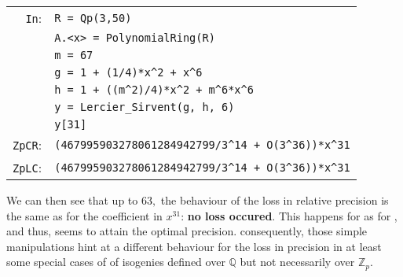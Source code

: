 \documentclass[sigconf]{acmart}
\newcommand{\ZpCR}{\text{\color{output} \rm \tt ZpCR}\xspace}
\newcommand{\ZpLC}{\text{\color{output} \rm \tt ZpLC}\xspace}
\newcommand{\cIn}{{\color{input} \tt \phantom{Zp}In}:}
\newcommand{\cZpCR}{{\color{output} \tt ZpCR}:}
\newcommand{\cZpLC}{{\color{output} \tt ZpLC}:}
\theoremstyle{definition}
\begin{document}
\smallskip

{\noindent \small
\begin{tabular}{rl}
\cIn
 & \verb?R = Qp(3,50)? \\
 & \verb?A.<x> = ?{\color{constructor}\verb?PolynomialRing?}\verb?(R)? \\
 & \verb?m = 67? \\
 & \verb?g = 1 + (1/4)*x^2 + x^6? \\
 & \verb?h = 1 + ((m^2)/4)*x^2 + m^6*x^6? \\
 & \verb?y = ?{\color{function}\verb?Lercier_Sirvent?}\verb?(g, h, 6)? \\
 & \verb?y[31]? \\
\cZpCR
 & \verb?(467995903278061284942799/3^14 + O(3^36))*x^31? \\
\cZpLC
 & \verb?(467995903278061284942799/3^14 + O(3^36))*x^31? \\
\end{tabular}}

\smallskip

We can then see that up to $63,$ the behaviour
of the loss in relative precision is the same
as for the coefficient in $x^{31}$: \textbf{no loss
occured}. This happens for \ZpCR as for \ZpLC,
and thus, \ZpCR seems to attain the optimal precision.
consequently, those simple manipulations
hint at a different behaviour for the loss 
in precision in at least some special cases of
of isogenies defined over $\mathbb{Q}$
but not necessarily over $\mathbb{Z}_p.$ 



\end{document}
